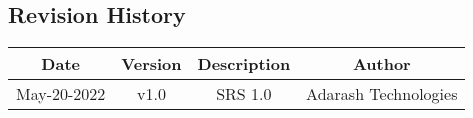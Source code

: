 


\begin{center}
\section*{Revision History}
\end{center}


\doublespacing
\vspace{1.0cm}
\noindent

\begin{center}
\begin{tabular}{ |c|c|c|c| } 
 \hline
 \textbf{Date} & \textbf{Version} & \textbf{Description} & \textbf{Author} \\ 
 \hline
 May-20-2022 & v1.0 & SRS 1.0 & Adarash Technologies\\
 \hline
\end{tabular}
\end{center}